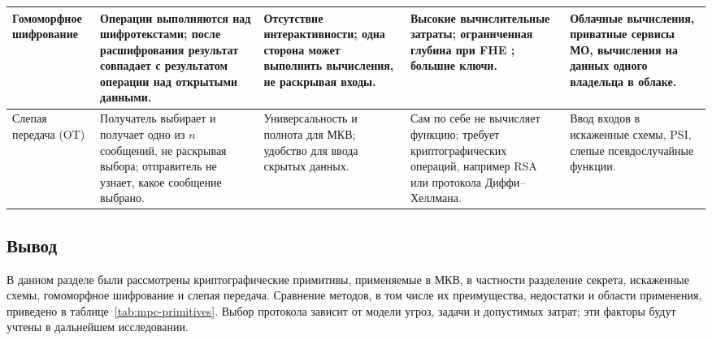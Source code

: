 {\begin{longtable}{|P{0.16\tablecontentwidth}|P{0.20\tablecontentwidth}|P{0.22\tablecontentwidth}|P{0.22\tablecontentwidth}|P{0.20\tablecontentwidth}|}
\hline
Гомо\-морфное шифрование & Операции выполняются над шифротекстами; после расшифрования результат совпадает с результатом операции над открытыми данными. & Отсутствие интерактивности; одна сторона может выполнить вычисления, не раскрывая входы. & Высокие вычислительные затраты; ограниченная глубина при FHE \cite{02}; большие ключи. & Облачные вычисления, приватные сервисы МО, вычисления на данных одного владельца в облаке. \\
\hline
Слепая передача (OT) & Получатель выбирает и получает одно из \(n\) сообщений, не раскрывая выбора; отправитель не узнает, какое сообщение выбрано. & Универсальность и полнота для МКВ; удобство для ввода скрытых данных. & Сам по себе не вычисляет функцию; требует криптографических операций, например RSA или протокола Диффи--Хеллмана. & Ввод входов в искаженные схемы, PSI, слепые псевдослучайные функции. \\
\hline
\end{longtable}
}

\subsection{Вывод}

В данном разделе были рассмотрены криптографические примитивы, применяемые в МКВ, в частности разделение секрета, искаженные схемы, гомоморфное шифрование и слепая передача. Сравнение методов, в том числе их преимущества, недостатки и области применения, приведено в таблице~\ref{tab:mpc-primitives}. Выбор протокола зависит от модели угроз, задачи и допустимых затрат; эти факторы будут учтены в дальнейшем исследовании.